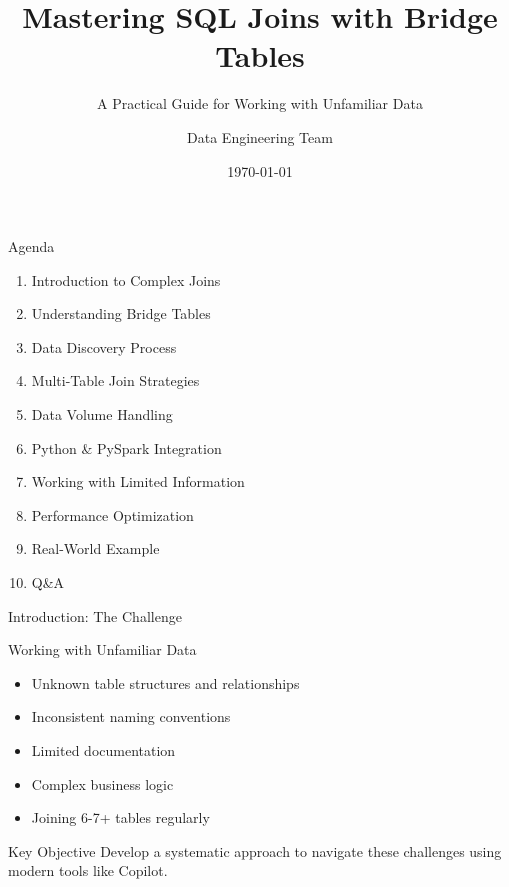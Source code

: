 \documentclass{beamer}
\title{Mastering SQL Joins with Bridge Tables}
\subtitle{A Practical Guide for Working with Unfamiliar Data}
\author{Data Engineering Team}
\institute{Enterprise Data Solutions}
\date{\today}
\begin{document}
	
	\begin{frame}
		\titlepage
	\end{frame}
	
	\begin{frame}{Agenda}
		\begin{enumerate}
			\item Introduction to Complex Joins
			\item Understanding Bridge Tables
			\item Data Discovery Process
			\item Multi-Table Join Strategies
			\item Data Volume Handling
			\item Python \& PySpark Integration
			\item Working with Limited Information
			\item Performance Optimization
			\item Real-World Example
			\item Q\&A
		\end{enumerate}
	\end{frame}
	
	\begin{frame}{Introduction: The Challenge}
		\begin{block}{Working with Unfamiliar Data}
			\begin{itemize}
				\item Unknown table structures and relationships
				\item Inconsistent naming conventions
				\item Limited documentation
				\item Complex business logic
				\item Joining 6-7+ tables regularly
			\end{itemize}
		\end{block}
		\vspace{0.5cm}
		\begin{alertblock}{Key Objective}
			Develop a systematic approach to navigate these challenges using modern tools like Copilot.
		\end{alertblock}
	\end{frame}
	
\end{document}
